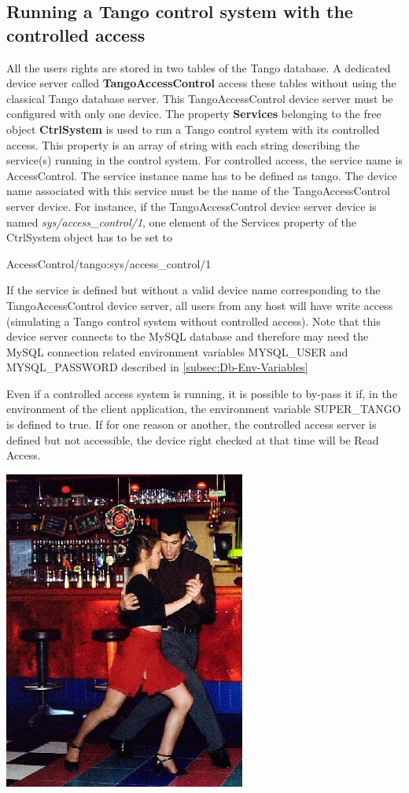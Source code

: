 \subsection{Running a Tango control system with the controlled access}

All the users rights are stored in two tables of the Tango database.
A dedicated device server called \textbf{TangoAccessControl}
access these tables without using the classical Tango database server.
This TangoAccessControl device server must be configured with only
one device. The property \textbf{Services }belonging
to the free object\textbf{ CtrlSystem} is used
to run a Tango control system with its controlled access. This property
is an array of string with each string describing the service(s) running
in the control system. For controlled access, the service name is
\textquotedbl{}AccessControl\textquotedbl{}. The service instance
name has to be defined as \textquotedbl{}tango\textquotedbl{}. The
device name associated with this service must be the name of the TangoAccessControl
server device. For instance, if the TangoAccessControl device server
device is named \emph{sys/access\_control/1}, one element of the Services
property of the CtrlSystem object has to be set to\begin{center}AccessControl/tango:sys/access\_control/1\end{center}

If the service is defined but without a valid device name corresponding
to the TangoAccessControl device server, all users from any host will
have write access (simulating a Tango control system without controlled
access). Note that this device server connects to the MySQL database
and therefore may need the MySQL connection related environment variables
MYSQL\_USER and MYSQL\_PASSWORD
described in \ref{subsec:Db-Env-Variables}

Even if a controlled access system is running, it is possible to by-pass
it if, in the environment of the client application, the environment
variable SUPER\_TANGO is defined to \textquotedbl{}true\textquotedbl{}.
If for one reason or another, the controlled access server is defined
but not accessible, the device right checked at that time will be
Read Access.\vspace{1cm}

\begin{center}
\label{FourRicardo}\includegraphics[scale=4]{dance/AT97-65-size}
\par\end{center}

